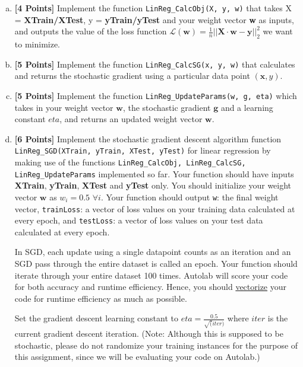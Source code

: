 \documentclass[a4paper]{article}
\theoremstyle{definition}
\def\x{\mathbf x}
\def\w{\mathbf w}
\newcommand \code [1]{{\tt #1}}
\begin{document}
\begin{enumerate}[(a)]
\item {\bf [4 Points]} Implement the function \code{LinReg\_CalcObj(X, y, w)} that takes X = \textbf{XTrain/XTest}, y = \textbf{yTrain/yTest} and your weight vector \textbf{w} as inputs, and outputs the value of the loss function $\mathcal{L}(\w)= \frac{1}{n}||\mathbf{X} \cdot \mathbf{w} - \mathbf{y}||_2^2$ we want to minimize.\\

\item {\bf [5 Points]} Implement the function \code{LinReg\_CalcSG(x, y, w)} that calculates and returns the stochastic gradient using a particular data point $(\x,y)$.\\

\item {\bf [5 Points]} Implement the function \code{LinReg\_UpdateParams(w, g, eta)} which takes in your weight vector $\w$, the stochastic gradient $\mathbf{g}$ and a learning constant $eta$, and returns an updated weight vector $\w$. \\

\item {\bf [6 Points]} Implement the stochastic gradient descent algorithm function \code{LinReg\_SGD(XTrain, yTrain, XTest, yTest)} for linear regression by making use of the functions \code{LinReg\_CalcObj, LinReg\_CalcSG, LinReg\_UpdateParams} implemented so far. Your function should have inputs \textbf{XTrain}, \textbf{yTrain}, \textbf{XTest} and \textbf{yTest} only. You should initialize your weight vector $\w$ as $w_i = 0.5$ $\forall i$. Your function should output \code{w}: the final weight vector, \code{trainLoss}: a vector of loss values on your training data calculated at every epoch, and \code{testLoss}: a vector of loss values on your test data calculated at every epoch.

In SGD, each update using a single datapoint counts as an iteration and an SGD pass through the entire dataset is called an epoch. Your function should iterate through your entire dataset 100 times. Autolab will score your code for both accuracy and runtime efficiency. Hence, you should \href{https://www.cs.cornell.edu/courses/cs1112/2013fa/Exams/exam2/vectorizedCode.pdf}{vectorize} your code for runtime efficiency as much as possible.

Set the gradient descent learning constant to $eta = \frac{0.5}{\sqrt(iter)}$ where $iter$ is the current gradient descent iteration. (Note: Although this is supposed to be stochastic, please do not randomize your training instances for the purpose of this assignment, since we will be evaluating your code on Autolab.)\\


\end{enumerate}
\end{document}
